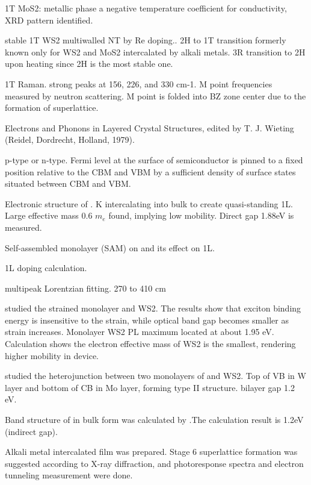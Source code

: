 1T MoS2: metallic phase a negative temperature coefficient for conductivity, XRD pattern identified. \cite{Wypych1992}

stable 1T WS2 multiwalled NT by Re doping.\cite{Enyashin2011}. 2H to 1T transition formerly known only for WS2 and MoS2 intercalated by alkali metals. 3R transition to 2H upon heating since 2H is the most stable one.

1T  Raman. \cite{Yang1991} strong peaks at 156, 226, and 330 cm-1. M point frequencies measured by neutron scattering. M point is folded into BZ zone center due to the formation of superlattice.

Electrons and Phonons in Layered Crystal Structures, edited by T. J. Wieting (Reidel, Dordrecht, Holland, 1979).

 p-type or n-type.  Fermi level at the surface of semiconductor is pinned to a fixed position relative to the CBM and VBM by a sufficient density of surface states situated between CBM and VBM. \cite{Baglio1983}

Electronic structure of .\cite{Eknapakul2014} K intercalating into bulk to create quasi-standing 1L. Large effective mass 0.6 $m_e$ found, implying low mobility. Direct gap 1.88eV is measured.

Self-assembled monolayer (SAM) on  and its effect on  1L.\cite{Najmaei2014}

 1L doping calculation. \cite{Ma2011}




multipeak Lorentzian fitting. 270 to 410 cm


\citeauthor{Shi2013} studied the strained monolayer  and WS2. The results show that exciton binding energy is insensitive to the strain, while optical band gap becomes smaller as strain increases. Monolayer WS2 PL maximum located at about 1.95 eV. Calculation shows the electron effective mass of WS2 is the smallest, rendering higher mobility in device.\cite{Shi2013}

\citeauthor{Kosmider2013} studied the heterojunction between two monolayers of  and WS2. Top of VB in W layer and bottom of CB in Mo layer, forming type II structure. bilayer gap 1.2 eV.\cite{Kosmider2013}


Band structure  of  in bulk form was calculated by \citeauthor{Mattheiss1973}.The calculation result is 1.2eV (indirect gap).\cite{Mattheiss1973}

Alkali metal intercalated  film was prepared.\cite{Homyonfer1997} Stage 6 superlattice formation was suggested according to X-ray diffraction, and photoresponse spectra and electron tunneling measurement were done.



